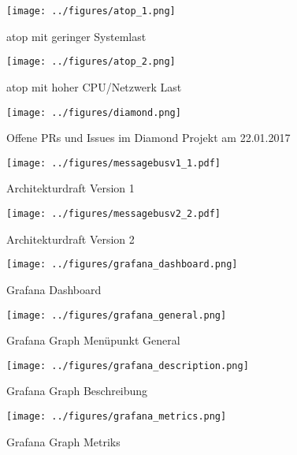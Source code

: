 \begin{figure}[tbph]
  \centering
  \texttt{[image: ../figures/atop\_1.png]}
  \caption{atop mit geringer Systemlast}
\label{figure:atop1}
\end{figure}

\begin{figure}[tbp]
  \centering
  \texttt{[image: ../figures/atop\_2.png]}
  \caption{atop mit hoher CPU/Netzwerk Last}
\label{figure:atop2}
\end{figure}

\begin{figure}[tbp]
  \centering
  \texttt{[image: ../figures/diamond.png]}
  \caption{Offene PRs und Issues im Diamond Projekt am 22.01.2017}
\label{figure:diamond}
\end{figure}

\begin{figure}[tbp]
  \centering
  \texttt{[image: ../figures/messagebusv1\_1.pdf]}
  \caption{Architekturdraft Version 1}
\label{figure:draft1}
\end{figure}
\begin{figure}[tbp]
  \centering
  \texttt{[image: ../figures/messagebusv2\_2.pdf]}
  \caption{Architekturdraft Version 2}
\label{figure:draft2}
\end{figure}
\FloatBarrier{}

\begin{figure}[tbp]
  \centering
  \texttt{[image: ../figures/grafana\_dashboard.png]}
  \caption{Grafana Dashboard}
\label{figure:grafana_dashboard}
\end{figure}

\begin{figure}[tbp]
  \centering
  \texttt{[image: ../figures/grafana\_general.png]}
  \caption{Grafana Graph Menüpunkt General}
\label{figure:grafana_general}
\end{figure}

\begin{figure}[tbp]
  \centering
  \texttt{[image: ../figures/grafana\_description.png]}
  \caption{Grafana Graph Beschreibung}
\label{figure:grafana_description}
\end{figure}

\begin{figure}[tbp]
  \centering
  \texttt{[image: ../figures/grafana\_metrics.png]}
  \caption{Grafana Graph Metriks}
\label{figure:grafana_metrics}
\end{figure}

